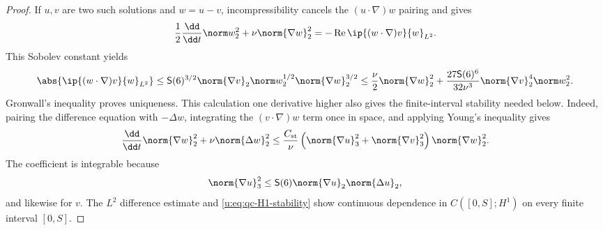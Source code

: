 \begin{proof}
If \(u,v\) are two such solutions and \(w=u-v\), incompressibility cancels
the \((u\cdot\nabla)w\) pairing and gives
\[
 \frac12\frac{\dd}{\dd t}\norm w_2^2
 +\nu\norm{\nabla w}_2^2
 =-\operatorname{Re}\ip{(w\cdot\nabla)v}{w}_{L^2}.
\]
This Sobolev constant yields
\[
 \abs{\ip{(w\cdot\nabla)v}{w}_{L^2}}
 \le \mathsf S(6)^{3/2}\norm{\nabla v}_2
       \norm w_2^{1/2}\norm{\nabla w}_2^{3/2}
 \le\frac\nu2\norm{\nabla w}_2^2
 +\frac{27\mathsf S(6)^6}{32\nu^3}
  \norm{\nabla v}_2^4\norm w_2^2.
\]
Gronwall's inequality proves uniqueness.  This calculation one derivative
higher also gives the finite-interval stability needed below.  Indeed, pairing
the difference equation with \(-\Delta w\), integrating the
\((v\cdot\nabla)w\) term once in space, and applying Young's inequality gives
\begin{equation}
 \frac{\dd}{\dd t}\norm{\nabla w}_2^2
 +\nu\norm{\Delta w}_2^2
 \le \frac{C_{\rm st}}\nu
 \left(\norm{\nabla u}_3^2+\norm{\nabla v}_3^2\right)
 \norm{\nabla w}_2^2.
 \label{u:eq:qc-H1-stability}
\end{equation}
The coefficient is integrable because
\[
 \norm{\nabla u}_3^2
 \le \mathsf S(6)\norm{\nabla u}_2\norm{\Delta u}_2,
\]
and likewise for \(v\).  The \(L^2\) difference estimate and
\eqref{u:eq:qc-H1-stability} show continuous dependence in
\(C([0,S];H^1)\) on every finite interval \([0,S]\).


\end{proof}
